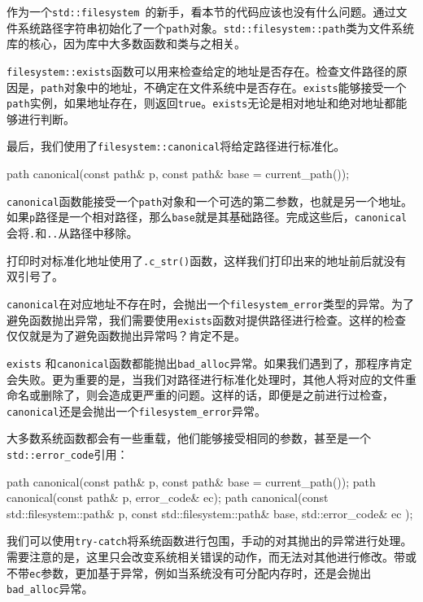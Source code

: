 
作为一个\texttt{std::filesystem }的新手，看本节的代码应该也没有什么问题。通过文件系统路径字符串初始化了一个\texttt{path}对象。\texttt{std::filesystem::path}类为文件系统库的核心，因为库中大多数函数和类与之相关。

\texttt{filesystem::exists}函数可以用来检查给定的地址是否存在。检查文件路径的原因是，\texttt{path}对象中的地址，不确定在文件系统中是否存在。\texttt{exists}能够接受一个\texttt{path}实例，如果地址存在，则返回\texttt{true}。\texttt{exists}无论是相对地址和绝对地址都能够进行判断。

最后，我们使用了\texttt{filesystem::canonical}将给定路径进行标准化。

\begin{codebox}[cpp]
path canonical(const path& p, const path& base = current_path());
\end{codebox}

\texttt{canonical}函数能接受一个\texttt{path}对象和一个可选的第二参数，也就是另一个地址。如果\texttt{p}路径是一个相对路径，那么\texttt{base}就是其基础路径。完成这些后，\texttt{canonical}会将\texttt{.}和\texttt{..}从路径中移除。

打印时对标准化地址使用了\texttt{.c\_str()}函数，这样我们打印出来的地址前后就没有双引号了。


\texttt{canonical}在对应地址不存在时，会抛出一个\texttt{filesystem\_error}类型的异常。为了避免函数抛出异常，我们需要使用\texttt{exists}函数对提供路径进行检查。这样的检查仅仅就是为了避免函数抛出异常吗？肯定不是。

\texttt{exists} 和\texttt{canonical}函数都能抛出\texttt{bad\_alloc}异常。如果我们遇到了，那程序肯定会失败。更为重要的是，当我们对路径进行标准化处理时，其他人将对应的文件重命名或删除了，则会造成更严重的问题。这样的话，即便是之前进行过检查，\texttt{canonical}还是会抛出一个\texttt{filesystem\_error}异常。

大多数系统函数都会有一些重载，他们能够接受相同的参数，甚至是一个\texttt{ std::error\_code}引用：

\begin{codebox}[cpp]
path canonical(const path& p, const path& base = current_path());
path canonical(const path& p, error_code& ec);
path canonical(const std::filesystem::path& p,
               const std::filesystem::path& base,
               std::error_code& ec );
\end{codebox}

我们可以使用\texttt{try-catch}将系统函数进行包围，手动的对其抛出的异常进行处理。需要注意的是，这里只会改变系统相关错误的动作，而无法对其他进行修改。带或不带\texttt{ec}参数，更加基于异常，例如当系统没有可分配内存时，还是会抛出\texttt{bad\_alloc}异常。


